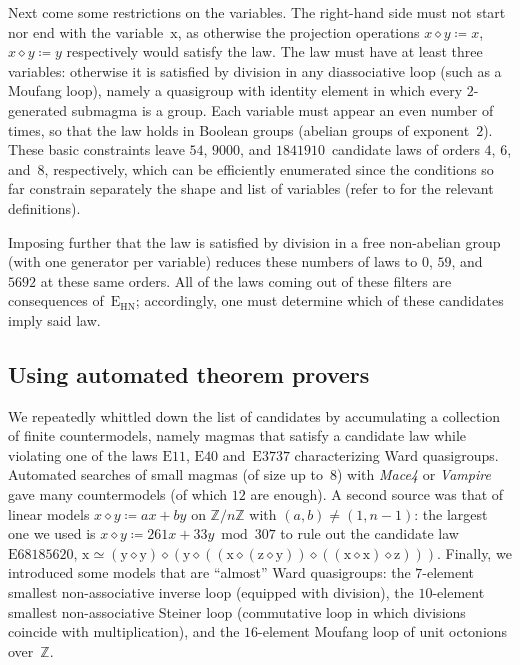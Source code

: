 \documentclass[12pt]{amsart}
\theoremstyle{definition}
\newcommand{\x}{\mathrm{x}}
\newcommand{\y}{\mathrm{y}}
\newcommand{\z}{\mathrm{z}}
\newcommand{\op}{\diamond}
\newcommand{\formaleq}{\simeq}
\newcommand{\Eq}[1]{\mathrm{E}#1}
\newcommand{\E}{\mathrm{E}}
\begin{document}
Next come some restrictions on the variables.
The right-hand side must not start nor end with the variable~$\x$, as otherwise the projection operations $x\op y \coloneqq x$, $x\op y\coloneqq y$ respectively would satisfy the law.
The law must have at least three variables: otherwise it is satisfied by division in any diassociative loop (such as a Moufang loop), namely a quasigroup with identity element in which every $2$-generated submagma is a group.
Each variable must appear an even number of times, so that the law holds in Boolean groups (abelian groups of exponent~$2$).
These basic constraints leave $54$, $\num{9000}$, and $\num{1841910}$~candidate laws of orders $4$, $6$, and~$8$, respectively, which can be efficiently enumerated since the conditions so far constrain separately the shape and list of variables (refer to  for the relevant definitions).

Imposing further that the law is satisfied by division in a free non-abelian group (with one generator per variable) reduces these numbers of laws to $0$, $59$, and $\num{5692}$ at these same orders.  All of the laws coming out of these filters are consequences of~$\E_{\mathrm{HN}}$; accordingly, one must determine which of these candidates imply said law.

\subsection{Using automated theorem provers}

We repeatedly whittled down the list of candidates by accumulating a collection of finite countermodels, namely magmas that satisfy a candidate law while violating one of the laws $\Eq{11}$, $\Eq{40}$ and~$\Eq{3737}$ characterizing Ward quasigroups.  Automated searches of small magmas (of size up to~$8$) with \emph{Mace4} or \emph{Vampire} gave many countermodels (of which $12$ are enough).  A second source was that of linear models $x \op y \coloneqq ax+by$ on $\mathbb{Z}/n\mathbb{Z}$ with $(a,b)\neq(1,n-1)$: the largest one we used is $x \op y \coloneqq 261x + 33y \bmod 307$ to rule out the candidate law $\Eq{68185620}$, $\x \formaleq (\y \op \y) \op (\y \op ((\x \op (\z \op \y)) \op ((\x \op \x) \op \z)))$.  Finally, we introduced some models that are ``almost'' Ward quasigroups: the $7$-element smallest non-associative inverse loop (equipped with division), the $10$-element smallest non-associative Steiner loop (commutative loop in which divisions coincide with multiplication), and the $16$-element Moufang loop of unit octonions over~$\mathbb{Z}$.
\end{document}

